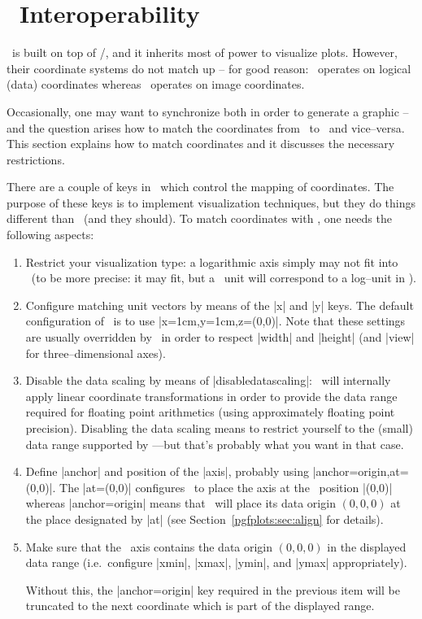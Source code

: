 \section{\tikzname\ Interoperability}
\label{pgfplots:tikz:interoperability}

\PGFPlots\ is built on top of \Tikz/\pgfname, and it inherits most of power to visualize plots. However, their coordinate systems do not match up -- for good reason: \PGFPlots\ operates on logical (data) coordinates whereas \Tikz\ operates on image coordinates. 

Occasionally, one may want to synchronize both in order to generate a graphic -- and the question arises how to match the coordinates from \Tikz\ to \PGFPlots\ and vice--versa. This section explains how to match coordinates and it discusses the necessary restrictions.

There are a couple of keys in \PGFPlots\ which control the mapping of coordinates. The purpose of these keys is to implement visualization techniques, but they do things different than \Tikz\ (and they should). To match coordinates with \Tikz, one needs the following aspects:
\begin{enumerate}
	\item Restrict your visualization type: a logarithmic axis simply may not fit into \Tikz\ (to be more precise: it may fit, but a \Tikz\ unit will correspond to a log--unit in \PGFPlots).

	\item Configure matching unit vectors by means of the |x| and |y| keys. The default configuration of \Tikz\ is to use |x=1cm,y=1cm,z={(0,0)}|. Note that these settings are usually overridden by \PGFPlots\ in order to respect |width| and |height| (and |view| for three--dimensional axes).
	\item Disable the data scaling by means of |disabledatascaling|: \PGFPlots\ will internally apply linear coordinate transformations in order to provide the data range required for floating point arithmetics (using approximately floating point precision). Disabling the data scaling means to restrict yourself to the (small) data range supported by \Tikz---but that's probably what you want in that case.
	\item Define |anchor| and position of the |axis|, probably using |anchor=origin,at={(0,0)}|. The |at={(0,0)}| configures \PGFPlots\ to place the axis at the \Tikz\ position |(0,0)| whereas |anchor=origin| means that \PGFPlots\ will place its data origin $(0,0,0)$ at the place designated by |at| (see Section~\ref{pgfplots:sec:align} for details).

	\item Make sure that the \PGFPlots\ axis contains the data origin $(0,0,0)$ in the displayed data range (i.e.\ configure |xmin|, |xmax|, |ymin|, and |ymax| appropriately).

	Without this, the |anchor=origin| key required in the previous item will be truncated to the next coordinate which is part of the displayed range.
\end{enumerate}

